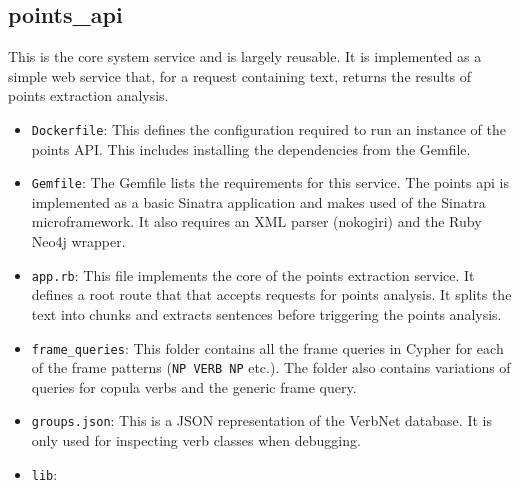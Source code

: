 \subsection*{points\_api}
  This is the core system service and is largely reusable. It is implemented as a simple web service that, for a request containing text, returns the results of points extraction analysis.
  \begin{itemize}
    \item
      \texttt{Dockerfile}: This defines the configuration required to run an instance of the points API. This includes installing the dependencies from the Gemfile.
    \item
      \texttt{Gemfile}: The Gemfile lists the requirements for this service. The points api is implemented as a basic Sinatra application and makes used of the Sinatra microframework. It also requires an XML parser (nokogiri) and the Ruby Neo4j wrapper.
    \item
      \texttt{app.rb}: This file implements the core of the points extraction service. It defines a root route that that accepts requests for points analysis. It splits the text into chunks and extracts sentences before triggering the points analysis.
    \item
      \texttt{frame\_queries}: This folder contains all the frame queries in Cypher for each of the frame patterns (\texttt{NP VERB NP} etc.). The folder also contains variations of queries for copula verbs and the generic frame query.
    \item
      \texttt{groups.json}: This is a JSON representation of the VerbNet database. It is only used for inspecting verb classes when debugging.
    \item
      \texttt{lib}:


\end{itemize}

